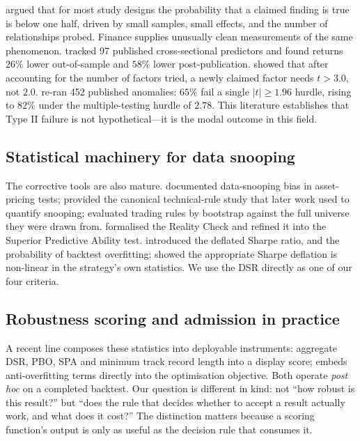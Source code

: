 \documentclass[11pt]{article}
\begin{document}
\citet{ioannidis} argued that for most study designs the probability that a claimed finding is
true is below one half, driven by small samples, small effects, and the number of relationships
probed. Finance supplies unusually clean measurements of the same phenomenon.
\citet{mcleanpontiff} tracked 97 published cross-sectional predictors and found returns $26\%$
lower out-of-sample and $58\%$ lower post-publication. \citet{harveyliuzhu} showed that after
accounting for the number of factors tried, a newly claimed factor needs $t>3.0$, not $2.0$.
\citet{houxuezhang} re-ran 452 published anomalies: $65\%$ fail a single $|t|\ge1.96$ hurdle,
rising to $82\%$ under the multiple-testing hurdle of $2.78$. This literature establishes that
Type II failure is not hypothetical---it is the modal outcome in this field.

\subsection{Statistical machinery for data snooping}

The corrective tools are also mature. \citet{lomackinlay} documented data-snooping bias in
asset-pricing tests; \citet{brock1992} provided the canonical technical-rule study that later
work used to quantify snooping; \citet{stwbootstrap} evaluated trading rules by bootstrap
against the full universe they were drawn from. \citet{white2000} formalised the Reality Check
and \citet{hansen2005} refined it into the Superior Predictive Ability test. \citet{dsr}
introduced the deflated Sharpe ratio, and \citet{pbo} the probability of backtest overfitting;
\citet{harveyliu} showed the appropriate Sharpe deflation is non-linear in the strategy's own
statistics. We use the DSR \citep{dsr} directly as one of our four criteria.

\subsection{Robustness scoring and admission in practice}

A recent line composes these statistics into deployable instruments: \citet{minerva} aggregate
DSR, PBO, SPA and minimum track record length into a display score; \citet{gtscore} embeds
anti-overfitting terms directly into the optimisation objective. Both operate \emph{post hoc} on
a completed backtest. Our question is different in kind: not ``how robust is this result?'' but
``does the rule that decides whether to accept a result actually work, and what does it cost?''
The distinction matters because a scoring function's output is only as useful as the decision
rule that consumes it.
\end{document}
